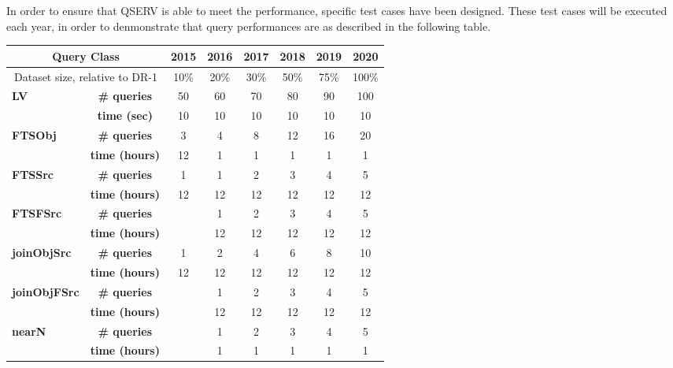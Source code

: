 \documentclass[DM,lsstdraft,STS,toc]{lsstdoc}
\begin{document}
In order to ensure that QSERV is able to meet the performance, specific test cases have been designed.
These test cases will be executed each year, in order to denmonstrate that query performances are as described in the following table.


    \begin{tabular}{lccccccc}\hline
      \multicolumn{2}{c}{\textbf{Query Class}}
        &\textbf{2015}&\textbf{2016}&\textbf{2017}&\textbf{2018}&\textbf{2019}&\textbf{2020}\\\hline
      \multicolumn{2}{c}{Dataset size, relative to DR-1} 
                              & 10\% & 20\% & 30\% & 50\% & 75\% & 100\% \\ \hline
      \multirow{2}{*}{\textbf{LV}}
        &\textbf{\# queries}  & 50   & 60   & 70   & 80   & 90   & 100 \\%
        &\textbf{time (sec)}  & 10   & 10   & 10   & 10   & 10   &  10 \\\hline
      \multirow{2}{*}{\textbf{FTSObj}}
        &\textbf{\# queries}  &  3 &  4 &  8 & 12 & 16 &  20 \\%
        &\textbf{time (hours)}& 12 &  1 &  1 &  1 &  1 &   1 \\\hline
      \multirow{2}{*}{\textbf{FTSSrc}}
        &\textbf{\# queries}  &  1 &  1 &  2 &  3 &  4 &   5 \\%
        &\textbf{time (hours)}& 12 & 12 & 12 & 12 & 12 &  12 \\\hline
      \multirow{2}{*}{\textbf{FTSFSrc}}
        &\textbf{\# queries}  &    &  1 &  2 &  3 &  4 &   5 \\%
        &\textbf{time (hours)}&    & 12 & 12 & 12 & 12 &  12 \\\hline
      \multirow{2}{*}{\textbf{joinObjSrc}}
        &\textbf{\# queries}  &  1 &  2 &  4 &  6 &  8 &  10 \\%
        &\textbf{time (hours)}& 12 & 12 & 12 & 12 & 12 &  12 \\\hline
      \multirow{2}{*}{\textbf{joinObjFSrc}}
        &\textbf{\# queries}  &    &  1 &  2 &  3 &  4 &   5 \\%
        &\textbf{time (hours)}&    & 12 & 12 & 12 & 12 &  12 \\\hline
      \multirow{2}{*}{\textbf{nearN}}
        &\textbf{\# queries}  &    &  1 &  2 &  3 &  4 &   5 \\%
        &\textbf{time (hours)}&    &  1 &  1 &  1 &  1 &   1 \\\hline
    \end{tabular}
\end{document}
